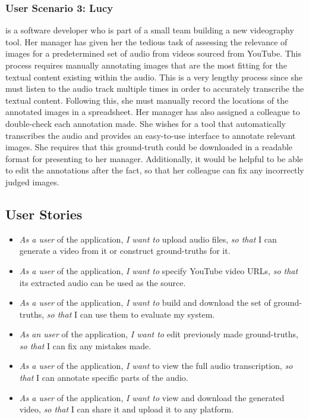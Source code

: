 \documentclass{l4proj}
\begin{document}
\subsubsection{User Scenario 3: Lucy} is a software developer who is part of a small team building a new videography tool. Her manager has given her the tedious task of assessing the relevance of images for a predetermined set of audio from videos sourced from YouTube. This process requires manually annotating images that are the most fitting for the textual content existing within the audio. This is a very lengthy process since she must listen to the audio track multiple times in order to accurately transcribe the textual content. Following this, she must manually record the locations of the annotated images in a spreadsheet. Her manager has also assigned a colleague to double-check each annotation made. She wishes for a tool that automatically transcribes the audio and provides an easy-to-use interface to annotate relevant images. She requires that this ground-truth could be downloaded in a readable format for presenting to her manager. Additionally, it would be helpful to be able to edit the annotations after the fact, so that her colleague can fix any incorrectly judged images.


\subsection{User Stories}
\begin{itemize}
    \item \emph{As a user} of the application, \emph{I want to} upload audio files, \emph{so that} I can generate a video from it or construct ground-truths for it.
    \item \emph{As a user} of the application, \emph{I want to} specify YouTube video URLs, \emph{so that} its extracted audio can be used as the source.
    \item \emph{As a user} of the application, \emph{I want to} build and download the set of ground-truths, \emph{so that} I can use them to evaluate my system.
    \item \emph{As an user} of the application, \emph{I want to} edit previously made ground-truths, \emph{so that} I can fix any mistakes made.
    \item \emph{As a user} of the application, \emph{I want} to view the full audio transcription, \emph{so that} I can annotate specific parts of the audio.
    \item \emph{As a user} of the application, \emph{I want to} view and download the generated video, \emph{so that} I can share it and upload it to any platform.
\end{itemize}
\end{document}

